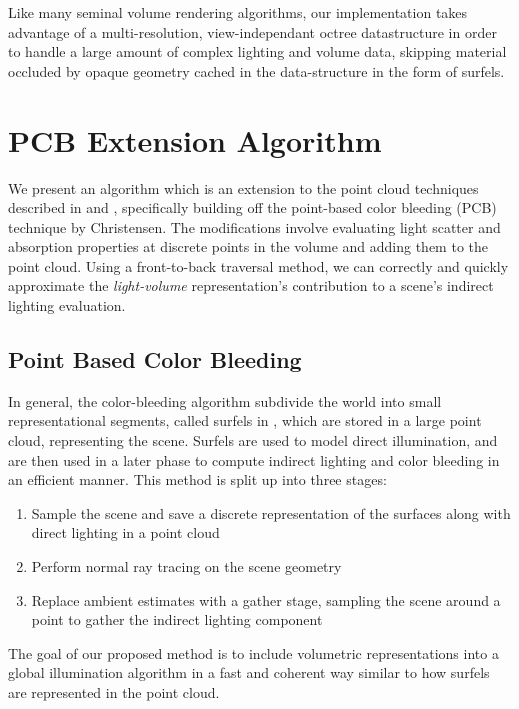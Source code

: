 \documentclass[12pt]{ucthesis}
\begin{document}
Like many seminal volume rendering algorithms, our implementation takes advantage of a multi-resolution, view-independant octree datastructure in order to handle a large amount of complex lighting and volume data, skipping material occluded by opaque geometry cached in the data-structure in the form of surfels.

\chapter{PCB Extension Algorithm}
\label{algorithm_sec}
We present an algorithm which is an extension to the point cloud techniques described in \cite{tabellion} and \cite{christensen:2008}, specifically building off the point-based color bleeding (PCB) technique by Christensen.  The modifications involve evaluating light scatter and absorption properties at discrete points in the volume and adding them to the point cloud.  Using a front-to-back traversal method, we can correctly and quickly approximate the \textit{light-volume} representation's contribution to a scene's indirect lighting evaluation.

\section{Point Based Color Bleeding}

In general, the color-bleeding algorithm subdivide the world into small representational segments, called surfels in \cite{christensen:2008}, which are stored in a large point cloud, representing the scene.  Surfels are used to model direct illumination, and are then used in a later phase to compute indirect lighting and color bleeding in an efficient manner.  This method is split up into three stages:

\begin{enumerate}
\item Sample the scene and save a discrete representation of the surfaces along with direct lighting in a point cloud
\item Perform normal ray tracing on the scene geometry
\item Replace ambient estimates with a gather stage, sampling the scene around a point to gather the indirect lighting component
\end{enumerate}

The goal of our proposed method is to include volumetric representations into a global illumination algorithm in a fast and coherent way similar to how surfels are represented in the point cloud.
\end{document}
